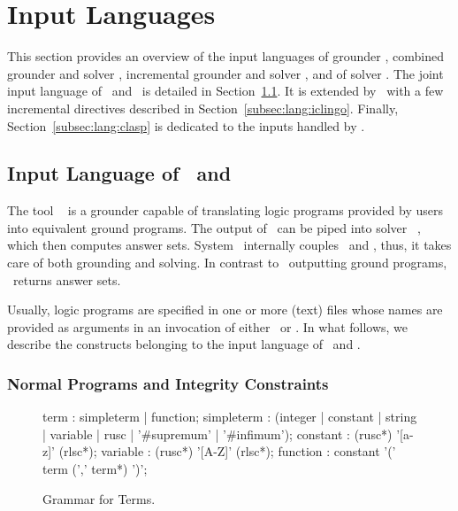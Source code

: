 \section{Input Languages}\label{sec:language}

This section provides an overview of the input languages of
grounder \gringo, combined grounder and solver \clingo,
incremental grounder and solver \iclingo, and of solver \clasp.
The joint input language of \gringo\ and \clingo\ is detailed in
Section~\ref{subsec:lang:gringo}.
It is extended by \iclingo\ with a few incremental directives described in Section~\ref{subsec:lang:iclingo}.
Finally, Section~\ref{subsec:lang:clasp} is dedicated to the inputs
handled by \clasp.


\subsection{Input Language of \gringo\ and \clingo}\label{subsec:lang:gringo}

The tool \gringo~\cite{gescth07a} is a grounder capable of translating
logic programs provided by users into equivalent ground programs.
The output of \gringo\ can be piped into solver \clasp~\cite{gekanesc07a},
which then computes answer sets.
System \clingo\ internally couples \gringo\ and \clasp, thus,
it takes care of both grounding and solving.
In contrast to \gringo\ outputting ground programs, 
\clingo\ returns answer sets.

Usually, logic programs are specified in one or more (text) files whose names are
provided as arguments
in an invocation of either \gringo\ or \clingo.
In what follows, we describe the 
constructs belonging to the input language of \gringo\ and \clingo.


\subsubsection{Normal Programs and Integrity Constraints}\label{subsec:gringo:normal}

\begin{figure}
\vspace*{-19mm}
\railnontermfont{\rmfamily\itshape}%
\begin{rail}
	term        : simpleterm | function;
	simpleterm  : (integer | constant | string | variable | rusc | '\#supremum' | '\#infimum');
	constant    : (rusc*) '[a-z]' (rlsc*);
	variable    : (rusc*) '[A-Z]' (rlsc*);
	function    : constant '(' term (',' term*) ')';
\end{rail}
\caption{Grammar for Terms.\label{fig:terms}}
\end{figure}

